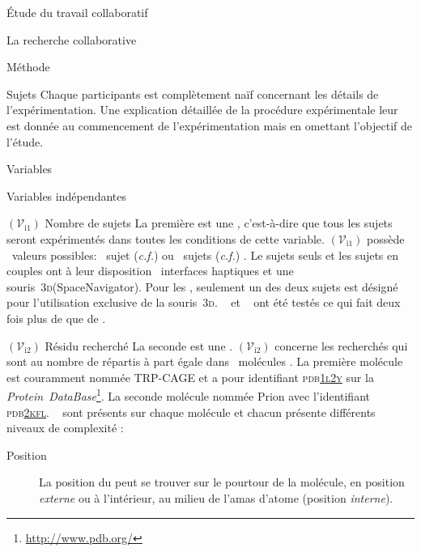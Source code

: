 \documentclass[myfrancais]{mythesis}
\newcommand{\mynum}[1]{\nombre{#1}}
\newcommand{\myvar}[2]{$\left(\mathcal{V}_{\mathrm{#1}#2}\right)$\xspace}
\newcommand{\myvari}[1]{\myvar{i}{#1}}
\newcommand{\myPDB}{\textsc{pdb}\xspace}
\newcommand{\myPDBbase}{\emph{Protein~DataBase}\xspace}
\newcommand{\myPDBlink}[2]{\href{#1}{\textsc{\MakeLowercase{#2}}}}
\newcommand{\TRPCAGE}{TRP-CAGE\xspace}
\newcommand{\Prion}{Prion\xspace}
\newcommand{\myemph}[1]{\emph{#1}}
\newcommand{\myThreeD}{\textsc{3d}\xspace}
\newcommand{\myregistered}{\textsuperscript{\textregistered}}
\newcommand{\mySpaceNavigator}{SpaceNavigator\myregistered\xspace}
\newcommand{\mycf}{\textit{c.f.}\xspace}
\begin{document}
\begin{mypart}{Étude du travail collaboratif}
\begin{mychapter}{La recherche collaborative}
\begin{mysection}{Méthode}
\begin{mysubsection}{Sujets}
					Chaque participants est complètement naïf concernant les détails de l'expérimentation.
					Une explication détaillée de la procédure expérimentale leur est donnée au commencement de l'expérimentation mais en omettant l'objectif de l'étude.
				\end{mysubsection}
				\begin{mysubsection}{Variables}
					\begin{mysubsubsection}{Variables indépendantes}
						\begin{myparagraph}{\myvari{1} Nombre de sujets}
							La première  est une , c'est-à-dire que tous les sujets seront expérimentés dans toutes les conditions de cette variable.
							\myvari{1} possède \mynum{2}~valeurs possibles: \og \mynum{1}~sujet (\mycf \myemph{}) \fg ou \og \mynum{2}~sujets (\mycf \myemph{}) \fg.
							Le sujets seuls et les sujets en couples ont à leur disposition \mynum{2}~interfaces haptiques et une souris~\myThreeD (\mySpaceNavigator).
							Pour les , seulement un des deux sujets est désigné pour l'utilisation exclusive de la souris~\myThreeD.
							\mynum{24}~ et \mynum{12}~ ont été testés ce qui fait deux fois plus de  que de .
						\end{myparagraph}
						\begin{myparagraph}{\myvari{2} Résidu recherché}
							La seconde  est une .
							\myvari{2} concerne les  recherchés qui sont au nombre de \mynum{10} répartis à part égale dans \mynum{2}~molécules .
							La première molécule est couramment nommée \TRPCAGE {} et a pour identifiant \myPDB \myPDBlink{http://www.rcsb.org/pdb/explore/explore.do?structureId=1L2Y}{1L2Y} sur la \myPDBbase\footnote{\url{http://www.pdb.org/}}.
							La seconde molécule nommée \Prion {} avec l'identifiant \myPDB \myPDBlink{http://www.rcsb.org/pdb/explore/explore.do?structureId=2KFL}{2KFL}.
							\mynum{5}~ sont présents sur chaque molécule  et chacun présente différents niveaux de complexité  :
							\begin{description}
								\item[Position] La position du  peut se trouver sur le pourtour de la molécule, en position \myemph{externe} ou à l'intérieur, au milieu de l'amas d'atome (position \myemph{interne}).

\end{description}
\end{myparagraph}
\end{mysubsubsection}
\end{mysubsection}
\end{mysection}
\end{mychapter}
\end{mypart}
\end{document}
